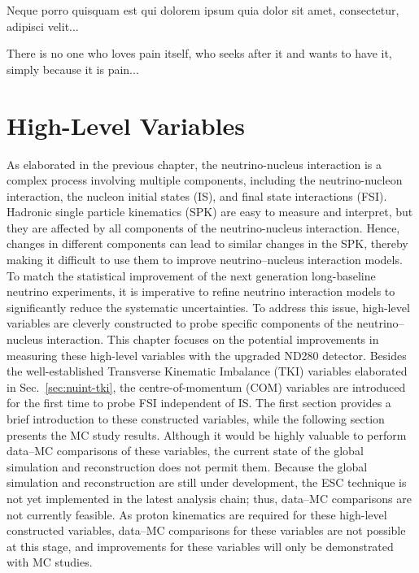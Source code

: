 \begin{savequote}[8cm]
\textlatin{Neque porro quisquam est qui dolorem ipsum quia dolor sit amet, consectetur, adipisci velit...}

There is no one who loves pain itself, who seeks after it and wants to have it, simply because it is pain...
\end{savequote}

\chapter{\label{ch:datamc}High-Level Variables} 
\minitoc

As elaborated in the previous chapter, the neutrino-nucleus interaction is a complex process involving multiple components, including the neutrino-nucleon interaction, the nucleon initial states (IS), and final state interactions (FSI).
Hadronic single particle kinematics (SPK) are easy to measure and interpret, but they are affected by all components of the neutrino-nucleus interaction. 
Hence, changes in different components can lead to similar changes in the SPK, thereby making it difficult to use them to improve neutrino–nucleus interaction models.
To match the statistical improvement of the next generation long-baseline neutrino experiments, it is imperative to refine neutrino interaction models to significantly reduce the systematic uncertainties.
To address this issue, high-level variables are cleverly constructed to probe specific components of the neutrino–nucleus interaction.
This chapter focuses on the potential improvements in measuring these high-level variables with the upgraded ND280 detector.
Besides the well-established Transverse Kinematic Imbalance (TKI) variables elaborated in Sec.~\ref{sec:nuint-tki}, the centre-of-momentum (COM) variables are introduced for the first time to probe FSI independent of IS.
The first section provides a brief introduction to these constructed variables, while the following section presents the MC study results.
Although it would be highly valuable to perform data–MC comparisons of these variables, the current state of the global simulation and reconstruction does not permit them.
Because the global simulation and reconstruction are still under development, the ESC technique is not yet implemented in the latest analysis chain; thus, data–MC comparisons are not currently feasible.
As proton kinematics are required for these high-level constructed variables, data–MC comparisons for these variables are not possible at this stage, and improvements for these variables will only be demonstrated with MC studies.

